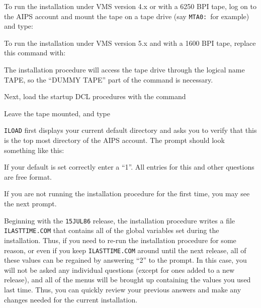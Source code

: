 To run the installation under VMS version 4.x or with a 6250 BPI tape,
log on to the AIPS account and mount the tape on a tape drive (say
{\tt MTA0:}~for example) and type:\medskip

\medskip

\noindent To run the installation under VMS version 5.x and with a 1600 BPI tape,
replace this command with:\medskip

\medskip

\noindent
The installation procedure will access the tape drive through the
logical name TAPE, so the ``DUMMY TAPE'' part of the command is
necessary.

Next, load the startup DCL procedures with the command\medskip

\medskip

\medskip
{}

Leave the tape mounted, and type\medskip

\medskip

\noindent
{\tt ILOAD} first displays your current default directory and asks you to
verify that this is the top most directory of the AIPS account.
The prompt should look something like this:\medskip

\medskip

\noindent
If your default is set correctly enter a ``1''.
All entries for this and other questions are free format.

If you are not running the installation procedure for the first time,
you may see the next prompt.\medskip

\medskip

\noindent
Beginning with the {\tt 15JUL86} release, the installation procedure writes a
file {\tt ILASTTIME.COM} that contains all of the global variables set during
the installation.  Thus, if you need to re-run the installation
procedure for some reason, or even if you keep {\tt ILASTTIME.COM} around
until the next release, all of these values can be regained by
answering ``2'' to the prompt.  In this case, you will not be asked any
individual questions (except for ones added to a new release), and all
of the menus will be brought up containing the values you used last
time.  Thus, you can quickly review your previous answers and make any
changes needed for the current installation.

